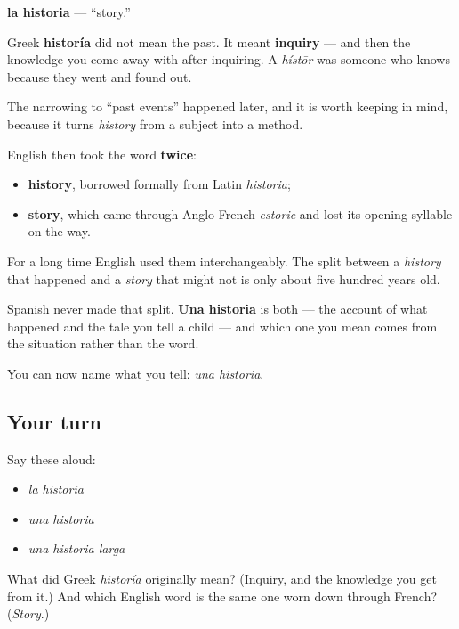 \begin{cousinweb}
\textbf{la historia} — \textquotedblleft{}story.\textquotedblright{}

Greek \textbf{historía} did not mean the past. It meant \textbf{inquiry} — and then the knowledge you come away with after inquiring. A \emph{hístōr} was someone who knows because they went and found out.

The narrowing to \textquotedblleft{}past events\textquotedblright{} happened later, and it is worth keeping in mind, because it turns \emph{history} from a subject into a method.

English then took the word \textbf{twice}:

\begin{itemize}
\raggedright
  \item \textbf{history}, borrowed formally from Latin \emph{historia};
  \item \textbf{story}, which came through Anglo-French \emph{estorie} and lost its opening syllable on the way.
\end{itemize}

For a long time English used them interchangeably. The split between a \emph{history} that happened and a \emph{story} that might not is only about five hundred years old.

Spanish never made that split. \textbf{Una historia} is both — the account of what happened and the tale you tell a child — and which one you mean comes from the situation rather than the word.
\end{cousinweb}

\begin{grammarlens}[title={What you've built}]
You can now name what you tell: \emph{una historia}.
\end{grammarlens}

\subsection*{Your turn}
Say these aloud:

\begin{itemize}
\raggedright
  \item \emph{la historia}
  \item \emph{una historia}
  \item \emph{una historia larga}
\end{itemize}

\begin{tcolorbox}[breakable,colback=teal!4,colframe=teal!35!black,title={Before you move on}]
What did Greek \emph{historía} originally mean? (Inquiry, and the knowledge you get from it.) And which English word is the same one worn down through French? (\emph{Story}.)
\end{tcolorbox}
